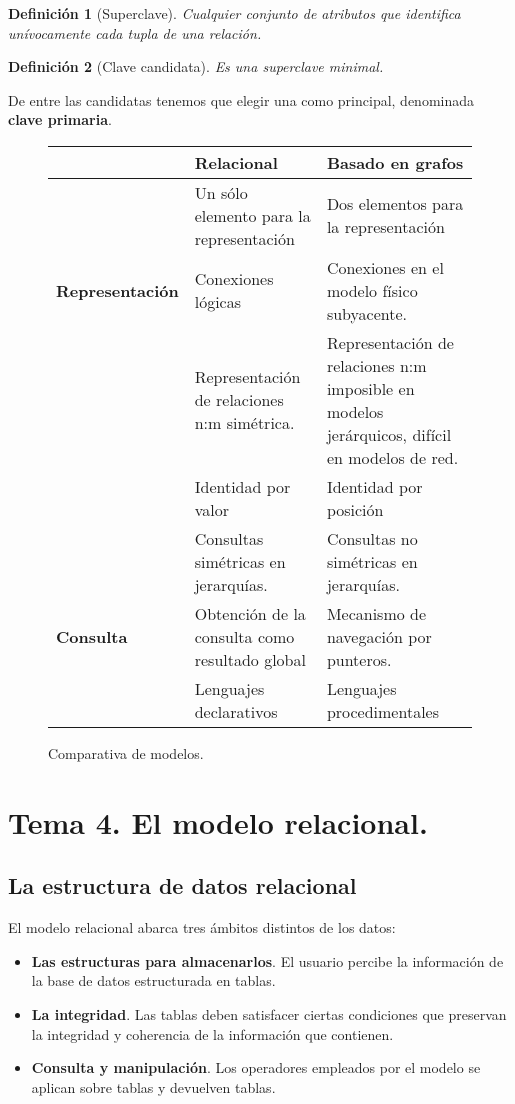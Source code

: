 \documentclass[12pt,spanish]{article}
\newtheorem{definition}{Definición}
\numberwithin{definition}{subsection}
\begin{document}
\begin{definition}[Superclave]
	Cualquier conjunto de atributos que identifica unívocamente cada \emph{tupla} de una relación.
\end{definition}

\begin{definition}[Clave candidata]
	Es una superclave minimal.
\end{definition}

De entre las candidatas tenemos que elegir una como principal, denominada \textbf{clave primaria}.

\begin{figure}[H]
\centering
\begin{tabular}{|m{3cm}|m{6cm}|m{6cm}|}
\hline
 & \textbf{Relacional} & \textbf{Basado en grafos} \\
\hline
 & Un sólo elemento para la representación & Dos elementos para la representación \\
\textbf{Representación} & Conexiones lógicas & Conexiones en el modelo físico subyacente.\\
 & Representación de relaciones n:m simétrica. & Representación de relaciones n:m imposible en modelos jerárquicos, difícil en modelos de red. \\
 & Identidad por valor & Identidad por posición \\
 \hline
 & Consultas simétricas en jerarquías. & Consultas no simétricas en jerarquías. \\
\textbf{Consulta} & Obtención de la consulta como resultado global & Mecanismo de navegación por punteros.\\
 & Lenguajes declarativos & Lenguajes procedimentales \\
 \hline
\end{tabular}
\caption{Comparativa de modelos.}
\end{figure}

\section{Tema 4. El modelo relacional.}


\subsection{La estructura de datos relacional}

El modelo relacional abarca tres ámbitos distintos de los datos:

\begin{itemize}
	\item \textbf{Las estructuras para almacenarlos}. El usuario percibe la información de la base de datos estructurada en tablas.
	\item \textbf{La integridad}. Las tablas deben satisfacer ciertas condiciones que preservan la integridad y coherencia de la información que contienen.
	\item \textbf{Consulta y manipulación}. Los operadores empleados por el modelo se aplican sobre tablas y devuelven tablas.
\end{itemize}
\end{document}
